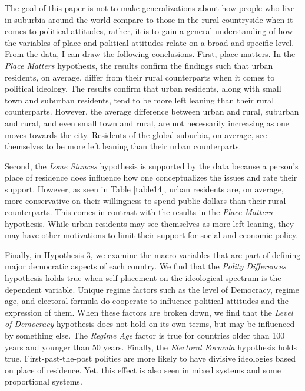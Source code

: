 \documentclass[12pt, titlepage]{article}
\newcommand\e{\emph}
\begin{document}
The goal of this paper is not to make generalizations about how people who live in suburbia around the world compare to those in the rural countryside when it comes to political attitudes, rather, it is to gain a general understanding of how the variables of place and political attitudes relate on a broad and specific level. From the data, I can draw the following conclusions. First, place matters. In the \e{Place Matters} hypothesis, the results confirm the findings such that urban residents, on average, differ from their rural counterparts when it comes to political ideology. The results confirm that urban residents, along with small town and suburban residents, tend to be more left leaning than their rural counterparts. However, the average difference between urban and rural, suburban and rural, and even small town and rural, are not necessarily increasing as one moves towards the city. Residents of the global suburbia, on average, see themselves to be more left leaning than their urban counterparts.

Second, the \e{Issue Stances} hypothesis is supported by the data because a person's place of residence does influence how one conceptualizes the issues and rate their support. However, as seen in Table \ref{table14}, urban residents are, on average, more conservative on their willingness to spend public dollars than their rural counterparts. This comes in contrast with the results in the \e{Place Matters} hypothesis. While urban residents may see themselves as more left leaning, they may have other motivations to limit their support for social and economic policy.

Finally, in Hypothesis 3, we examine the macro variables that are part of defining major democratic aspects of each country. We find that the \e{Polity Differences} hypothesis holds true when self-placement on the ideological spectrum is the dependent variable. Unique regime factors such as the level of Democracy, regime age, and electoral formula do cooperate to influence political attitudes and the expression of them. When these factors are broken down, we find that the \e{Level of Democracy} hypothesis does not hold on its own terms, but may be influenced by something else. The \e{Regime Age} factor is true for countries older than 100 years and younger than 50 years. Finally, the \e{Electoral Formula} hypothesis holds true. First-past-the-post polities are more likely to have divisive ideologies based on place of residence. Yet, this effect is also seen in mixed systems and some proportional systems.
\end{document}
